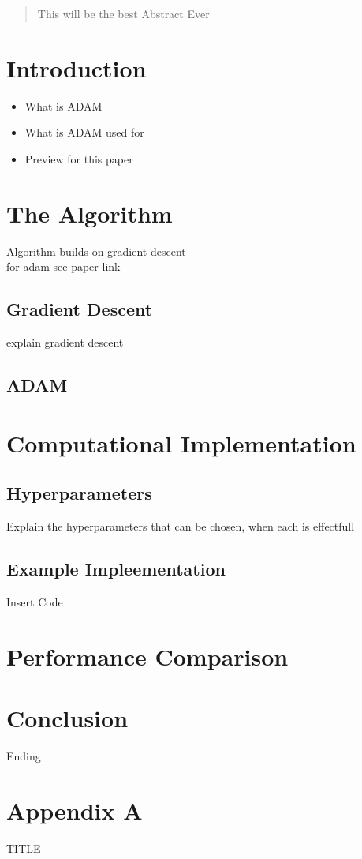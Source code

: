 \documentclass[journal]{IEEEtran}
\begin{document}
\tableofcontents 
\vspace{1.5cm}

\begin{abstract}
    This will be the best Abstract Ever 
\end{abstract}

\section{Introduction}
\begin{itemize}
    \item What is ADAM
    \item What is ADAM used for
    \item Preview for this paper
\end{itemize}


\section{The Algorithm}
Algorithm builds on gradient descent\\
for adam see paper \href{https://arxiv.org/abs/1412.6980}{link}
\subsection{Gradient Descent}
explain gradient descent
\subsection{ADAM}


\section{Computational Implementation}
\subsection{Hyperparameters}
Explain the hyperparameters that can be chosen, when each is effectfull
\subsection{Example Impleementation}
Insert Code

\section{Performance Comparison}

 
\section{Conclusion}
Ending




\onecolumn
\newpage
\pagestyle{fancy}

\section{Appendix A}
\centering TITLE
\end{document}
